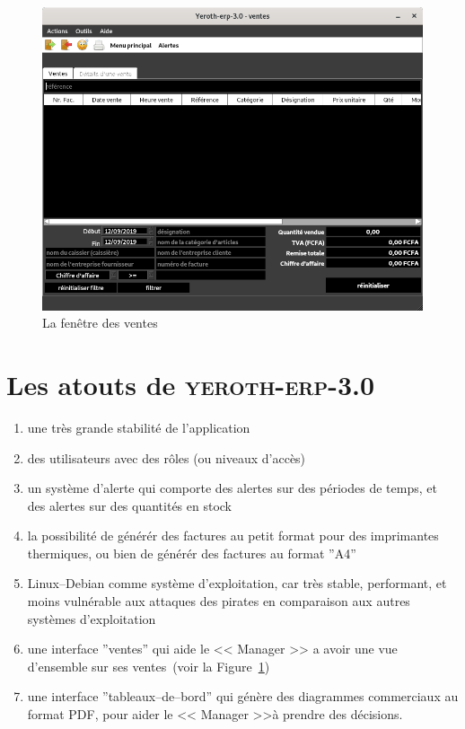 \documentclass[a4paper, 10pt, twocolumn]{article}
\newcommand{\yeren}{\textsc{yeroth-erp-3.0}\xspace}
\newcommand{\manager}{<< Manager >>\xspace}
\begin{document}
\begin{figure}[!htbp]
\centering
\includegraphics[scale=0.32]{../images/yeren-fenetre-caisse.png}
\caption{La fen\^etre des ventes}
\label{fig:fenetre-de-la-vente}
\end{figure}

\vspace{-1.9em}
\section{Les atouts de \yeren}
\vspace{-0.9em}
\begin{enumerate}[1)]
	\itemsep -0.3em
	\item une tr\`es grande stabilit\'e de l'application
	\item des utilisateurs avec des r\^oles (ou niveaux
	  d'acc\`es)
	\item un syst\`eme d'alerte qui comporte des alertes
	      sur des p\'eriodes de temps, et des alertes sur des
	      quantit\'es en stock
	\item la possibilit\'e de g\'en\'er\'er des factures au
	      petit format pour des imprimantes thermiques, ou bien
	      de g\'en\'er\'er des factures au format ''A4''
	\item Linux--Debian comme syst\`eme d'exploitation, car
	      tr\`es stable, performant, et moins vuln\'erable
	      aux attaques des pirates en comparaison aux autres
	      syst\`emes d'exploitation
	\item une interface ''ventes'' qui aide le \manager a
	      avoir une vue d'ensemble sur ses 
	      ventes~(voir la Figure~\ref{fig:fenetre-de-la-vente})
	\item une interface ''tableaux--de--bord'' qui
		  g\'en\`ere des diagrammes commerciaux au format PDF,
		  pour aider le \manager \`a prendre des d\'ecisions.
\end{enumerate}
\end{document}
